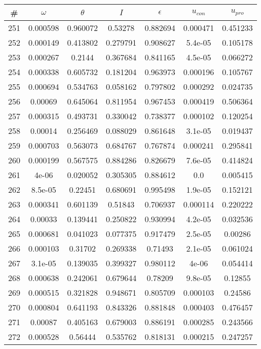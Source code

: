 \newpage
\begin{table}
\begin{tabular}{c|c|c|c|c|c|c}
\# & $\omega$ & $\theta$ & $I$ & $\epsilon$ & $u_{con}$ & $u_{pro}$\\
\hline
251 & 0.000598 & 0.960072 & 0.53278 & 0.882694 & 0.000471 & 0.451233\\
252 & 0.000149 & 0.413802 & 0.279791 & 0.908627 & 5.4e-05 & 0.105178\\
253 & 0.000267 & 0.2144 & 0.367684 & 0.841165 & 4.5e-05 & 0.066272\\
254 & 0.000338 & 0.605732 & 0.181204 & 0.963973 & 0.000196 & 0.105767\\
255 & 0.000694 & 0.534763 & 0.058162 & 0.797802 & 0.000292 & 0.024735\\
256 & 0.00069 & 0.645064 & 0.811954 & 0.967453 & 0.000419 & 0.506364\\
257 & 0.000315 & 0.493731 & 0.330042 & 0.738377 & 0.000102 & 0.120254\\
258 & 0.00014 & 0.256469 & 0.088029 & 0.861648 & 3.1e-05 & 0.019437\\
259 & 0.000703 & 0.563073 & 0.684767 & 0.767874 & 0.000241 & 0.295841\\
260 & 0.000199 & 0.567575 & 0.884286 & 0.826679 & 7.6e-05 & 0.414824\\
261 & 4e-06 & 0.020052 & 0.305305 & 0.884612 & 0.0 & 0.005415\\
262 & 8.5e-05 & 0.22451 & 0.680691 & 0.995498 & 1.9e-05 & 0.152121\\
263 & 0.000341 & 0.601139 & 0.51843 & 0.706937 & 0.000114 & 0.220222\\
264 & 0.00033 & 0.139441 & 0.250822 & 0.930994 & 4.2e-05 & 0.032536\\
265 & 0.000681 & 0.041023 & 0.077375 & 0.917479 & 2.5e-05 & 0.00286\\
266 & 0.000103 & 0.31702 & 0.269338 & 0.71493 & 2.1e-05 & 0.061024\\
267 & 3.1e-05 & 0.139035 & 0.399327 & 0.980112 & 4e-06 & 0.054414\\
268 & 0.000638 & 0.242061 & 0.679644 & 0.78209 & 9.8e-05 & 0.12855\\
269 & 0.000515 & 0.321828 & 0.948671 & 0.805709 & 0.000103 & 0.24586\\
270 & 0.000804 & 0.641193 & 0.843326 & 0.881848 & 0.000403 & 0.476457\\
271 & 0.00087 & 0.405163 & 0.679003 & 0.886191 & 0.000285 & 0.243566\\
272 & 0.000528 & 0.56444 & 0.535762 & 0.818131 & 0.000215 & 0.247257\\

\end{tabular}
\end{table}
